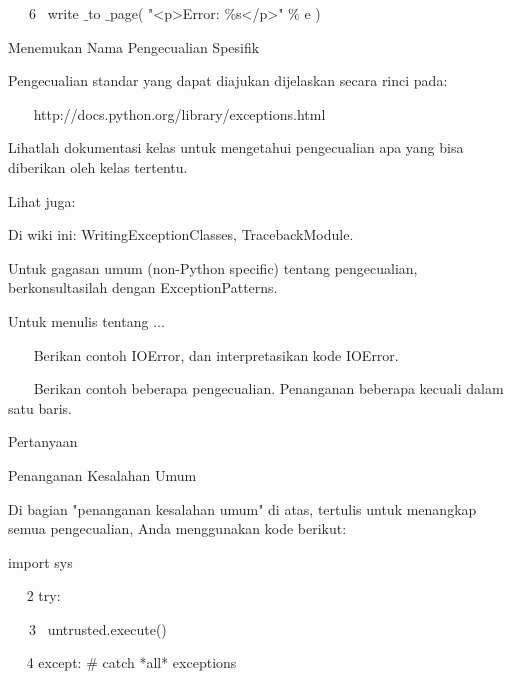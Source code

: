 ~~~6~  write $  \_  $to $  \_  $page( "<p>Error:  $  \%  $s</p>"  $  \%  $ e ) \par
\vspace{12pt}
Menemukan Nama Pengecualian Spesifik \par
\vspace{12pt}
Pengecualian standar yang dapat diajukan dijelaskan secara rinci pada: \par
\vspace{12pt}
~~~ http://docs.python.org/library/exceptions.html \par
\vspace{12pt}
Lihatlah dokumentasi kelas untuk mengetahui pengecualian apa yang bisa diberikan oleh kelas tertentu. \par
\vspace{12pt}
Lihat juga: \par
\vspace{12pt}
Di wiki ini: WritingExceptionClasses, TracebackModule. \par
\vspace{12pt}
Untuk gagasan umum (non-Python specific) tentang pengecualian, berkonsultasilah dengan ExceptionPatterns. \par
\vspace{12pt}
Untuk menulis tentang ... \par
\vspace{12pt}
~~~ Berikan contoh IOError, dan interpretasikan kode IOError. \par
~~~ Berikan contoh beberapa pengecualian. Penanganan beberapa kecuali dalam satu baris. \par
\vspace{12pt}
Pertanyaan \par
\vspace{12pt}
Penanganan Kesalahan Umum \par
\vspace{12pt}
Di bagian "penanganan kesalahan umum" di atas, tertulis untuk menangkap semua pengecualian, Anda menggunakan kode berikut: \par
\vspace{12pt}
import sys \par
~~ 2 try: \par
\vspace{12pt}
~~~3~  untrusted.execute() \par
\vspace{12pt}
~~ 4 except:  $  \#  $ catch *all* exceptions \par
\vspace{12pt}
